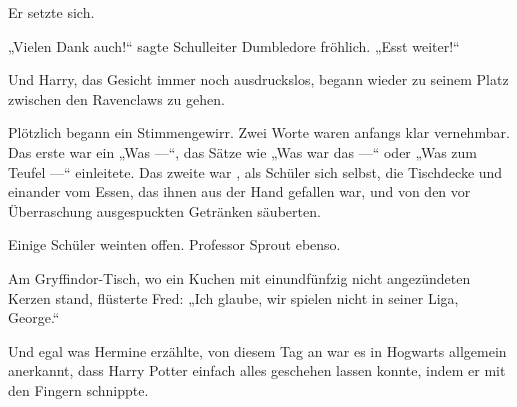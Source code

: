 Er setzte sich.

„Vielen Dank auch!“ sagte Schulleiter Dumbledore fröhlich.
„Esst weiter!“

Und Harry, das Gesicht immer noch ausdruckslos, begann wieder zu seinem Platz zwischen den Ravenclaws zu gehen.

Plötzlich begann ein Stimmengewirr. Zwei Worte waren anfangs klar vernehmbar. Das erste war ein
„Was —“, das Sätze wie
„Was war das —“ oder
„Was zum Teufel —“ einleitete. Das zweite war , als Schüler sich selbst, die Tischdecke und einander vom Essen, das ihnen aus der Hand gefallen war, und von den vor Überraschung ausgespuckten Getränken säuberten.

Einige Schüler weinten offen. Professor Sprout ebenso.

Am Gryffindor-Tisch, wo ein Kuchen mit einundfünfzig nicht angezündeten Kerzen stand, flüsterte Fred:
„Ich glaube, wir spielen nicht in seiner Liga, George.“%

Und egal was Hermine erzählte, von diesem Tag an war es in Hogwarts allgemein anerkannt, dass Harry Potter einfach alles geschehen lassen konnte, indem er mit den Fingern schnippte.

